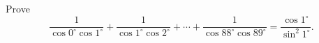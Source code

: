 Prove\[ \frac{1}{\cos 0^\circ \cos 1^\circ} + \frac{1}{\cos 1^\circ \cos 2^\circ} + \cdots + \frac{1}{\cos 88^\circ \cos 89^\circ} = \frac{\cos 1^\circ}{\sin^2 1^\circ}.  \]